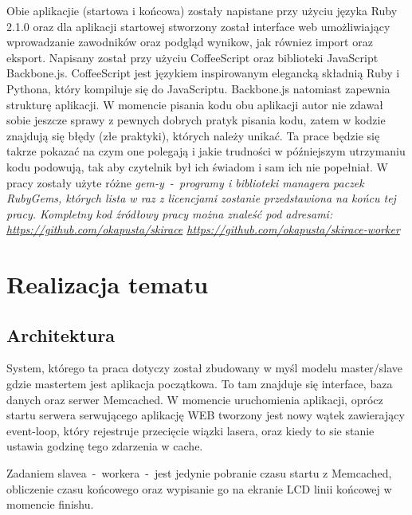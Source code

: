\documentclass[11pt,a4paper, twoside]{article}
\begin{document}
Obie aplikacjie (startowa i końcowa) zostały napistane przy użyciu języka Ruby 2.1.0 oraz dla aplikacji startowej stworzony został interface web umożliwiający wprowadzanie zawodników oraz podgląd wynikow, jak równiez import oraz eksport. Napisany został przy użyciu CoffeeScript oraz biblioteki JavaScript Backbone.js. 
CoffeeScript jest językiem inspirowanym elegancką składnią Ruby i Pythona, który kompiluje się do JavaScriptu. Backbone.js natomiast zapewnia strukturę aplikacji.
\newline
\newline
\noindent
W momencie pisania kodu obu aplikacji autor nie zdawał sobie jeszcze sprawy z pewnych dobrych pratyk pisania kodu, zatem w kodzie znajdują się błędy (złe praktyki), których należy unikać. Ta prace będzie się takrze pokazać na czym one polegają i jakie trudności w późniejszym utrzymaniu kodu podowują, tak aby czytelnik był ich świadom i sam ich nie popełniał.
\newline
\newline
\noindent
W pracy zostały użyte różne \em{gem-y}~-~programy i biblioteki managera paczek \emph{RubyGems}, których lista w raz z licencjami zostanie przedstawiona na końcu tej pracy.
\newline
\newline
\noindent
Kompletny kod źródłowy pracy można znaleść pod adresami:
\newline
\url{https://github.com/okapusta/skirace}
\newline
\url{https://github.com/okapusta/skirace-worker}
\section{Realizacja tematu}
\subsection{Architektura}
System, którego ta praca dotyczy został zbudowany w myśl modelu master/slave gdzie mastertem jest aplikacja początkowa. To tam znajduje się interface, baza danych oraz serwer Memcached. W momencie uruchomienia aplikacji, oprócz startu serwera serwującego aplikację WEB tworzony jest nowy wątek zawierający event-loop, który rejestruje przecięcie wiązki lasera, oraz kiedy to sie stanie ustawia godzinę tego zdarzenia w cache.

Zadaniem slavea~-~workera~-~jest jedynie pobranie czasu startu z Memcached, obliczenie czasu końcowego oraz wypisanie go na ekranie LCD linii końcowej w momencie finishu.
\newline
\end{document}
